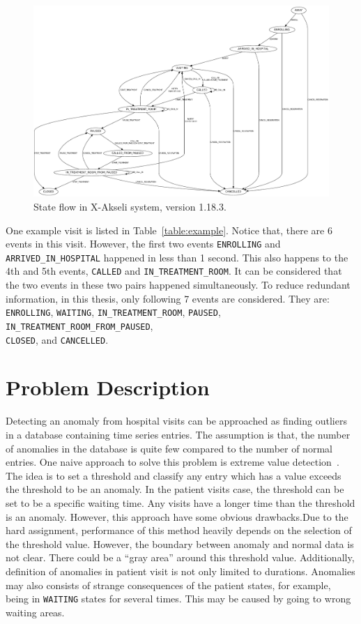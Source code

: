 \begin{figure}
	\begin{center}
		\includegraphics[width=\textwidth]{images/patientFsm}
		\caption{State flow in X-Akseli system, version 1.18.3.}
		\label{fig:state}
	\end{center}
\end{figure}

One example visit is listed in Table~\ref{table:example}. Notice that, there are 6 events in this visit. However, the first two events \texttt{ENROLLING} and  \texttt{ARRIVED\_IN\_HOSPITAL} happened in less than 1 second. This also happens to the 4th and 5th events, \texttt{CALLED} and \texttt{IN\_TREATMENT\_ROOM}. It can be considered that the two events in these two pairs happened simultaneously. To reduce redundant information, in this thesis, only following 7 events are considered. They are: \texttt{ENROLLING}, \texttt{WAITING}, \texttt{IN\_TREATMENT\_ROOM}, \texttt{PAUSED}, \texttt{IN\_TREATMENT\_ROOM\_FROM\_PAUSED}, \\ \texttt{CLOSED}, and \texttt{CANCELLED}.

\section{Problem Description}
Detecting an anomaly from hospital visits can be approached as finding outliers in a database containing time series entries. The assumption is that, the number of anomalies in the database is quite few compared to the number of normal entries. One naive approach to solve this problem is extreme value detection~\cite{aggarwal2013introduction}. The idea is to set a threshold and classify any entry which has a value exceeds the threshold to be an anomaly. In the patient visits case, the threshold can be set to be a specific waiting time. Any visits have a longer time than the threshold is an anomaly. However, this approach have some obvious drawbacks.Due to the hard assignment, performance of this method heavily depends on the selection of the threshold value. However, the boundary between anomaly and normal data is not clear. There could be a ``gray area'' around this threshold value. Additionally, definition of anomalies in patient visit is not only limited to durations. Anomalies may also consists of strange consequences of the patient states, for example, being in \texttt{WAITING} states for several times. This may be caused by going to wrong waiting areas.

